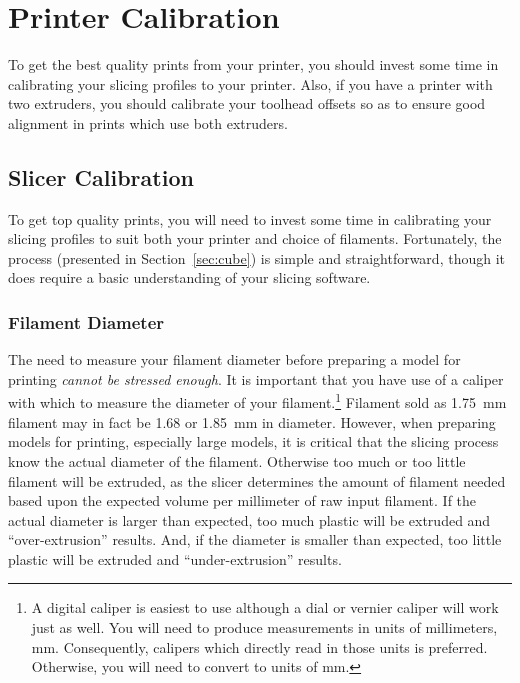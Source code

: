 
\chapter{Printer Calibration} \label{chap:tuning}

To get the best quality prints from your printer, you should invest some time in calibrating your slicing profiles to your printer.  Also, if you have a printer with two extruders, you should calibrate your \glspl{toolhead offset} so as to ensure good alignment in prints which use both extruders.


\section{Slicer Calibration}

To get top quality prints, you will need to invest some time in calibrating
your \glspl{slicing profile} to suit both your printer and choice of filaments.
Fortunately, the process (presented in Section~\ref{sec:cube}) is simple and straightforward, though it does require a basic understanding of your slicing software.



\subsection{Filament Diameter}

The need to measure your filament diameter before preparing a model for
printing \emph{cannot be stressed enough}.  It is important that you have use
of a caliper with which to measure the diameter of your filament.\footnote{A
digital caliper is easiest to use although a dial or vernier caliper will
work just as well.  You will need to produce measurements in units of
millimeters, mm.  Consequently, calipers which directly read in those units
is preferred.  Otherwise, you will need to convert to units of mm.}  Filament
sold as 1.75~mm filament may in fact be 1.68 or 1.85~mm in diameter.  However,
when preparing models for printing, especially large models,
it is critical that the slicing process know the actual diameter of the
filament.  Otherwise too much or too little filament will be extruded, as
the slicer determines the amount of filament needed based upon the
expected volume per millimeter of raw input filament.  If the actual diameter is
larger than expected, too much plastic will be extruded and
``\gls{over-extrusion}'' results.  And, if the diameter is smaller than
expected, too little plastic will be extruded and ``\gls{under-extrusion}''
results.

